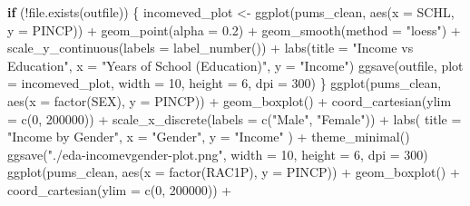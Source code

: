 \documentclass[
  letterpaper,
  DIV=11,
  numbers=noendperiod]{scrartcl}
\newenvironment{Shaded}{\begin{snugshade}}{\end{snugshade}}
\newcommand{\AttributeTok}[1]{\textcolor[rgb]{0.40,0.45,0.13}{#1}}
\newcommand{\ControlFlowTok}[1]{\textcolor[rgb]{0.00,0.23,0.31}{\textbf{#1}}}
\newcommand{\DecValTok}[1]{\textcolor[rgb]{0.68,0.00,0.00}{#1}}
\newcommand{\FloatTok}[1]{\textcolor[rgb]{0.68,0.00,0.00}{#1}}
\newcommand{\FunctionTok}[1]{\textcolor[rgb]{0.28,0.35,0.67}{#1}}
\newcommand{\NormalTok}[1]{\textcolor[rgb]{0.00,0.23,0.31}{#1}}
\newcommand{\OtherTok}[1]{\textcolor[rgb]{0.00,0.23,0.31}{#1}}
\newcommand{\SpecialCharTok}[1]{\textcolor[rgb]{0.37,0.37,0.37}{#1}}
\newcommand{\StringTok}[1]{\textcolor[rgb]{0.13,0.47,0.30}{#1}}
\begin{document}
\begin{Shaded}
\begin{Highlighting}[]
\ControlFlowTok{if}\NormalTok{ (}\SpecialCharTok{!}\FunctionTok{file.exists}\NormalTok{(outfile)) \{}
\NormalTok{  incomeved\_plot }\OtherTok{\textless{}{-}} \FunctionTok{ggplot}\NormalTok{(pums\_clean, }\FunctionTok{aes}\NormalTok{(}\AttributeTok{x =}\NormalTok{ SCHL, }\AttributeTok{y =}\NormalTok{ PINCP)) }\SpecialCharTok{+}
    \FunctionTok{geom\_point}\NormalTok{(}\AttributeTok{alpha =} \FloatTok{0.2}\NormalTok{) }\SpecialCharTok{+}
    \FunctionTok{geom\_smooth}\NormalTok{(}\AttributeTok{method =} \StringTok{"loess"}\NormalTok{) }\SpecialCharTok{+}
    \FunctionTok{scale\_y\_continuous}\NormalTok{(}\AttributeTok{labels =} \FunctionTok{label\_number}\NormalTok{()) }\SpecialCharTok{+}
    \FunctionTok{labs}\NormalTok{(}\AttributeTok{title =} \StringTok{"Income vs Education"}\NormalTok{, }\AttributeTok{x =} \StringTok{"Years of School (Education)"}\NormalTok{, }\AttributeTok{y =} \StringTok{"Income"}\NormalTok{)}
  \FunctionTok{ggsave}\NormalTok{(outfile, }\AttributeTok{plot =}\NormalTok{ incomeved\_plot, }\AttributeTok{width =} \DecValTok{10}\NormalTok{, }\AttributeTok{height =} \DecValTok{6}\NormalTok{, }\AttributeTok{dpi =} \DecValTok{300}\NormalTok{)}
\NormalTok{\}}
\FunctionTok{ggplot}\NormalTok{(pums\_clean, }\FunctionTok{aes}\NormalTok{(}\AttributeTok{x =} \FunctionTok{factor}\NormalTok{(SEX), }\AttributeTok{y =}\NormalTok{ PINCP)) }\SpecialCharTok{+}
  \FunctionTok{geom\_boxplot}\NormalTok{() }\SpecialCharTok{+}
  \FunctionTok{coord\_cartesian}\NormalTok{(}\AttributeTok{ylim =} \FunctionTok{c}\NormalTok{(}\DecValTok{0}\NormalTok{, }\DecValTok{200000}\NormalTok{)) }\SpecialCharTok{+}
  \FunctionTok{scale\_x\_discrete}\NormalTok{(}\AttributeTok{labels =} \FunctionTok{c}\NormalTok{(}\StringTok{"Male"}\NormalTok{, }\StringTok{"Female"}\NormalTok{)) }\SpecialCharTok{+}
  \FunctionTok{labs}\NormalTok{(}
    \AttributeTok{title =} \StringTok{"Income by Gender"}\NormalTok{,}
    \AttributeTok{x =} \StringTok{"Gender"}\NormalTok{,}
    \AttributeTok{y =} \StringTok{"Income"}
\NormalTok{  ) }\SpecialCharTok{+}
  \FunctionTok{theme\_minimal}\NormalTok{()}
\FunctionTok{ggsave}\NormalTok{(}\StringTok{"./eda{-}incomevgender{-}plot.png"}\NormalTok{, }\AttributeTok{width =} \DecValTok{10}\NormalTok{, }\AttributeTok{height =} \DecValTok{6}\NormalTok{, }\AttributeTok{dpi =} \DecValTok{300}\NormalTok{)}
\FunctionTok{ggplot}\NormalTok{(pums\_clean, }\FunctionTok{aes}\NormalTok{(}\AttributeTok{x =} \FunctionTok{factor}\NormalTok{(RAC1P), }\AttributeTok{y =}\NormalTok{ PINCP)) }\SpecialCharTok{+}
  \FunctionTok{geom\_boxplot}\NormalTok{() }\SpecialCharTok{+}
  \FunctionTok{coord\_cartesian}\NormalTok{(}\AttributeTok{ylim =} \FunctionTok{c}\NormalTok{(}\DecValTok{0}\NormalTok{, }\DecValTok{200000}\NormalTok{)) }\SpecialCharTok{+}

\end{Highlighting}
\end{Shaded}
\end{document}
